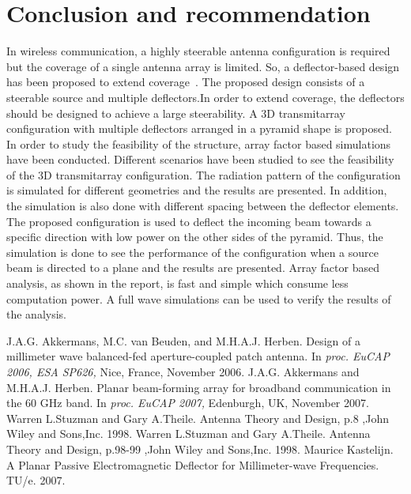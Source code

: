 \documentclass[titlepage]{article}
\begin{document}
\section{Conclusion and recommendation}
In wireless communication, a highly steerable antenna configuration is required but the coverage of a single antenna array is limited. So, a deflector-based design has been proposed to extend coverage~\cite{4}. The proposed design consists of a steerable source and multiple deflectors.In order to extend coverage, the deflectors should be designed to achieve a large steerability. A 3D transmitarray configuration with multiple deflectors arranged in a pyramid shape is proposed. In order to study the feasibility of the structure, array factor based simulations have been conducted.
\newline
Different scenarios have been studied to see the feasibility of the 3D transmitarray configuration. The radiation pattern of the configuration is simulated for different geometries and the results are presented. In addition, the simulation is also done with different spacing between the deflector elements.
The proposed configuration is used to deflect the incoming beam towards a specific direction with low power on the other sides of the pyramid. Thus, the simulation is done to see the performance of the configuration when a source beam is directed to a plane and the results are presented.
\newline
Array factor based analysis, as shown in the report, is fast and simple which consume less computation power. A full wave simulations can be used to verify the results of the analysis.
\newpage
\begin{thebibliography}{99}
    J.A.G. Akkermans, M.C. van Beuden, and M.H.A.J. Herben. Design of a millimeter wave balanced-fed aperture-coupled patch antenna. In \emph{proc. EuCAP 2006, ESA SP626,} Nice, France, November 2006.
    J.A.G. Akkermans and M.H.A.J. Herben. Planar beam-forming array for broadband communication in the 60 GHz band. In \emph{proc. EuCAP 2007,} Edenburgh, UK, November 2007.
    Warren L.Stuzman and Gary A.Theile. Antenna Theory and Design, p.8 ,John Wiley and Sons,Inc. 1998.
    Warren L.Stuzman and Gary A.Theile. Antenna Theory and Design, p.98-99 ,John Wiley and Sons,Inc. 1998.
    Maurice Kastelijn. A Planar Passive Electromagnetic  Deflector for Millimeter-wave Frequencies. TU/e. 2007.
\end{thebibliography}
\end{document}
